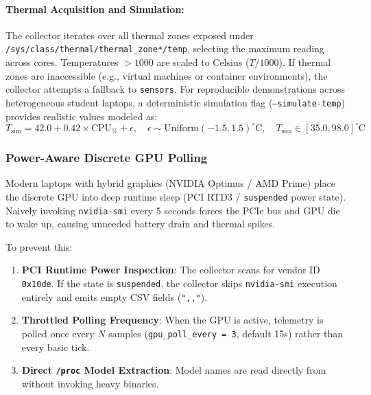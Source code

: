 \paragraph{Thermal Acquisition and Simulation:}
The collector iterates over all thermal zones exposed under \texttt{/sys/class/thermal/thermal\_zone*/temp}, selecting the maximum reading across cores. Temperatures $>1000$ are scaled to Celsius ($T/1000$). If thermal zones are inaccessible (e.g., virtual machines or container environments), the collector attempts a fallback to \texttt{sensors}. For reproducible demonstrations across heterogeneous student laptops, a deterministic simulation flag (\texttt{--simulate-temp}) provides realistic values modeled as:
\begin{equation}
    T_{\text{sim}} = 42.0 + 0.42 \times \text{CPU}_{\%} + \epsilon, \quad \epsilon \sim \text{Uniform}(-1.5, 1.5)^\circ\text{C}, \quad T_{\text{sim}} \in [35.0, 98.0]^\circ\text{C}
\end{equation}

\subsubsection{Power-Aware Discrete GPU Polling}
Modern laptops with hybrid graphics (NVIDIA Optimus / AMD Prime) place the discrete GPU into deep runtime sleep (PCI RTD3 / \texttt{suspended} power state). Naively invoking \texttt{nvidia-smi} every 5 seconds forces the PCIe bus and GPU die to wake up, causing unneeded battery drain and thermal spikes. 

To prevent this:
\begin{enumerate}
    \item \textbf{PCI Runtime Power Inspection}: The collector scans  for vendor ID \texttt{0x10de}. If the state is \texttt{suspended}, the collector skips \texttt{nvidia-smi} execution entirely and emits empty CSV fields (\texttt{",,"}).
    \item \textbf{Throttled Polling Frequency}: When the GPU is active, telemetry is polled once every $N$ samples (\texttt{gpu\_poll\_every = 3}, default 15s) rather than every basic tick.
    \item \textbf{Direct \texttt{/proc} Model Extraction}: Model names are read directly from  without invoking heavy binaries.
\end{enumerate}

